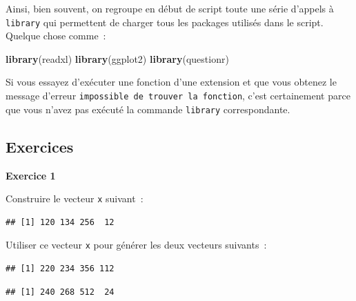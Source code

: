\documentclass[12pt,]{book}
\newenvironment{Shaded}{\begin{snugshade}}{\end{snugshade}}
\newcommand{\DecValTok}[1]{\textcolor[rgb]{0.06,0.06,0.06}{#1}}
\newcommand{\KeywordTok}[1]{\textcolor[rgb]{0.27,0.27,0.27}{\textbf{#1}}}
\newcommand{\NormalTok}[1]{#1}
\newcommand{\StringTok}[1]{\textcolor[rgb]{0.5,0.5,0.5}{#1}}
\begin{document}
Ainsi, bien souvent, on regroupe en début de script toute une série d'appels à \texttt{library} qui permettent de charger tous les packages utilisés dans le script. Quelque chose comme~:

\begin{Shaded}
\begin{Highlighting}[]
\KeywordTok{library}\NormalTok{(readxl)}
\KeywordTok{library}\NormalTok{(ggplot2)}
\KeywordTok{library}\NormalTok{(questionr)}
\end{Highlighting}
\end{Shaded}

Si vous essayez d'exécuter une fonction d'une extension et que vous obtenez le message d'erreur \texttt{impossible\ de\ trouver\ la\ fonction}, c'est certainement parce que vous n'avez pas exécuté la commande \texttt{library} correspondante.

\hypertarget{ex-introR}{%
\subsection{Exercices}\label{ex-introR}}

\textbf{Exercice 1}

Construire le vecteur \texttt{x} suivant~:

\begin{verbatim}
## [1] 120 134 256  12
\end{verbatim}

Utiliser ce vecteur \texttt{x} pour générer les deux vecteurs suivants~:

\begin{verbatim}
## [1] 220 234 356 112
\end{verbatim}

\begin{verbatim}
## [1] 240 268 512  24
\end{verbatim}
\end{document}
